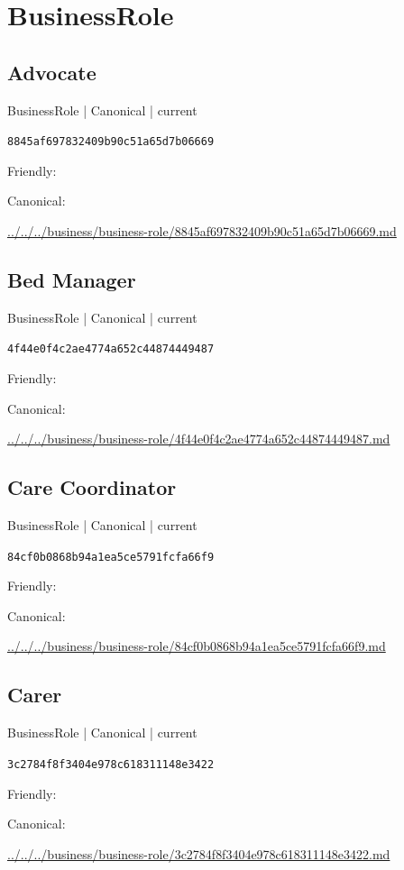 \documentclass[10pt,a4paper]{article}
\begin{document}
\section*{BusinessRole}
\subsection*{Advocate}
{\small BusinessRole | Canonical | current}\par
\texttt{8845af697832409b90c51a65d7b06669}\par
Friendly: \par
Canonical: \par
{\footnotesize\url{../../../business/business-role/8845af697832409b90c51a65d7b06669.md}}\par
\subsection*{Bed Manager}
{\small BusinessRole | Canonical | current}\par
\texttt{4f44e0f4c2ae4774a652c44874449487}\par
Friendly: \par
Canonical: \par
{\footnotesize\url{../../../business/business-role/4f44e0f4c2ae4774a652c44874449487.md}}\par
\subsection*{Care Coordinator}
{\small BusinessRole | Canonical | current}\par
\texttt{84cf0b0868b94a1ea5ce5791fcfa66f9}\par
Friendly: \par
Canonical: \par
{\footnotesize\url{../../../business/business-role/84cf0b0868b94a1ea5ce5791fcfa66f9.md}}\par
\subsection*{Carer}
{\small BusinessRole | Canonical | current}\par
\texttt{3c2784f8f3404e978c618311148e3422}\par
Friendly: \par
Canonical: \par
{\footnotesize\url{../../../business/business-role/3c2784f8f3404e978c618311148e3422.md}}\par
\end{document}
